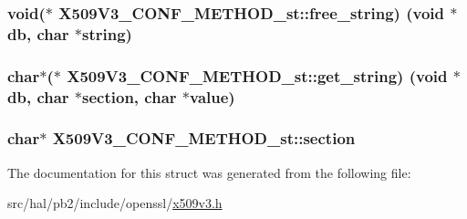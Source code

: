 \subsubsection[{\texorpdfstring{free\+\_\+string}{free_string}}]{\setlength{\rightskip}{0pt plus 5cm}void($\ast$ X509\+V3\+\_\+\+C\+O\+N\+F\+\_\+\+M\+E\+T\+H\+O\+D\+\_\+st\+::free\+\_\+string) (void $\ast$db, char $\ast$string)}\hypertarget{struct_x509_v3___c_o_n_f___m_e_t_h_o_d__st_aaebdc3bd7c731ad447fc1abb8f4a6bd8}{}\label{struct_x509_v3___c_o_n_f___m_e_t_h_o_d__st_aaebdc3bd7c731ad447fc1abb8f4a6bd8}
\subsubsection[{\texorpdfstring{get\+\_\+string}{get_string}}]{\setlength{\rightskip}{0pt plus 5cm}char$\ast$($\ast$ X509\+V3\+\_\+\+C\+O\+N\+F\+\_\+\+M\+E\+T\+H\+O\+D\+\_\+st\+::get\+\_\+string) (void $\ast$db, char $\ast${\bf section}, char $\ast$value)}\hypertarget{struct_x509_v3___c_o_n_f___m_e_t_h_o_d__st_a122df56f2ef2704b4362b5767c3571c0}{}\label{struct_x509_v3___c_o_n_f___m_e_t_h_o_d__st_a122df56f2ef2704b4362b5767c3571c0}
\subsubsection[{\texorpdfstring{section}{section}}]{\setlength{\rightskip}{0pt plus 5cm}char$\ast$ X509\+V3\+\_\+\+C\+O\+N\+F\+\_\+\+M\+E\+T\+H\+O\+D\+\_\+st\+::section}\hypertarget{struct_x509_v3___c_o_n_f___m_e_t_h_o_d__st_ac0685c3b398f0093e4d5c44c90259ac4}{}\label{struct_x509_v3___c_o_n_f___m_e_t_h_o_d__st_ac0685c3b398f0093e4d5c44c90259ac4}


The documentation for this struct was generated from the following file\+:\begin{DoxyCompactItemize}
\item 
src/hal/pb2/include/openssl/\hyperlink{x509v3_8h}{x509v3.\+h}\end{DoxyCompactItemize}
